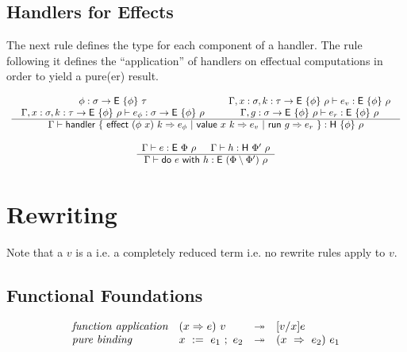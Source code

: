 \documentclass{article}
\begin{document}
\noindent
\subsection{Handlers for Effects}
The next rule defines the type for each component of a handler.
The rule following it defines the ``application'' of handlers on
effectual computations in order to yield a pure(er) result.


\[ \begin{array}{cc}

  \begin{array}{c} 
   \begin{array}{c}
    \phi : \sigma \rightarrow \textsf{E} ~ \{ \phi \} ~ \tau
    \\
    \Gamma, x:\sigma, k:\tau \rightarrow \textsf{E} ~ \{ \phi \} ~ \rho
    \vdash e_\phi:\sigma \rightarrow \textsf{E} ~ \{ \phi \} ~ \rho
   \end{array}
   \hspace{1.5em}
   \begin{array}{c}
    \Gamma, x:\sigma, k:\tau \rightarrow \textsf{E} ~ \{ \phi \} ~ \rho
    \vdash e_v:\textsf{E} ~ \{ \phi \} ~ \rho
    \\
    \Gamma, g:\sigma \rightarrow \textsf{E} ~ \{ \phi \} ~ \rho \vdash e_r:\textsf{E} ~ \{ \phi \} ~ \rho
   \end{array}
   \\ \hline 
   \Gamma \vdash
   \textsf{handler} ~ \{ ~
   \textsf{effect} ~ (\phi ~ x) ~ k \Rightarrow e_\phi ~ | ~
   \textsf{value} ~ x ~ k \Rightarrow e_v ~ | ~
   \textsf{run} ~ g \Rightarrow e_r
   ~ \} :
   \textsf{H} ~ \{ \phi \} ~ \rho
   \end{array}

  \\\\

  \begin{array}{c} 
   \Gamma \vdash e:\textsf{E} ~ \Phi ~ \rho
   \hspace{1.5em}
   \Gamma \vdash h:\textsf{H} ~ \Phi' ~ \rho
   \\ \hline 
   \Gamma \vdash
   \textsf{do} ~ e ~ \textsf{with} ~ h : \textsf{E} ~ (\Phi \setminus \Phi') ~ \rho
   \end{array}
 \end{array} \]

\newpage
\section{Rewriting}

Note that a $v$ is a 
i.e. a completely reduced term
i.e. no rewrite rules apply to $v$.

\subsection{Functional Foundations}

\[ \begin{array}{llcl}
    \textit{function application} &
      (x \Rightarrow e)~v &\twoheadrightarrow& [v/x] e
    \\
    \textit{pure binding} &
      x~:=~e_1~;~e_2 &\twoheadrightarrow& (x~\Rightarrow~e_2)~e_1
\end{array} \]
\end{document}
